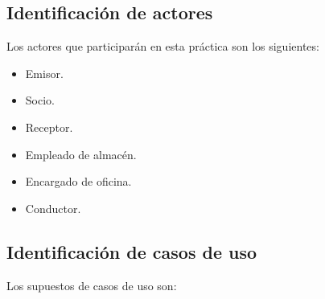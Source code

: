 \documentclass[12pt,spanish]{article}
\begin{document}
\subsection{Identificación de actores}
Los actores que participarán en esta práctica son los siguientes:
\begin{itemize}
\item Emisor.
\item Socio.
\item Receptor.
\item Empleado de almacén.
\item Encargado de oficina.
\item Conductor.
\end{itemize}
\subsection{Identificación de casos de uso}
Los supuestos de casos de uso son:
\end{document}
